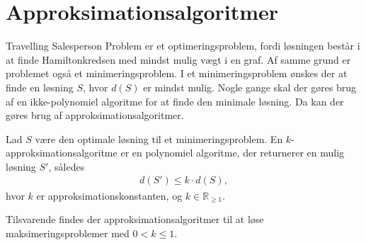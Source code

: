 \section{Approksimationsalgoritmer}
Travelling Salesperson Problem er et optimeringsproblem, fordi løsningen består i at finde Hamiltonkredsen med mindst mulig vægt i en graf. 
Af samme grund er problemet også et minimeringsproblem. 
I et minimeringsproblem ønskes der at finde en løsning $S$, hvor $d(S)$ er mindst mulig.
Nogle gange skal der gøres brug af en ikke-polynomiel algoritme for at finde den minimale løsning.
Da kan der gøres brug af approksimationsalgoritmer.

\begin{defn}\label{def:apk}
Lad $S$ være den optimale løsning til et minimeringsproblem. En $k$-approksimationsalgoritme er en polynomiel algoritme, der returnerer en mulig løsning $S'$, således
\begin{align*}
d(S') \leq k \cdot d(S),
\end{align*}
hvor $k$ er approksimationskonstanten, og $k \in \mathbb{R}_{\geq 1}$.
\end{defn}

Tilsvarende findes der approksimationsalgoritmer til at løse maksimeringsproblemer med $0 < k \leq 1$.
